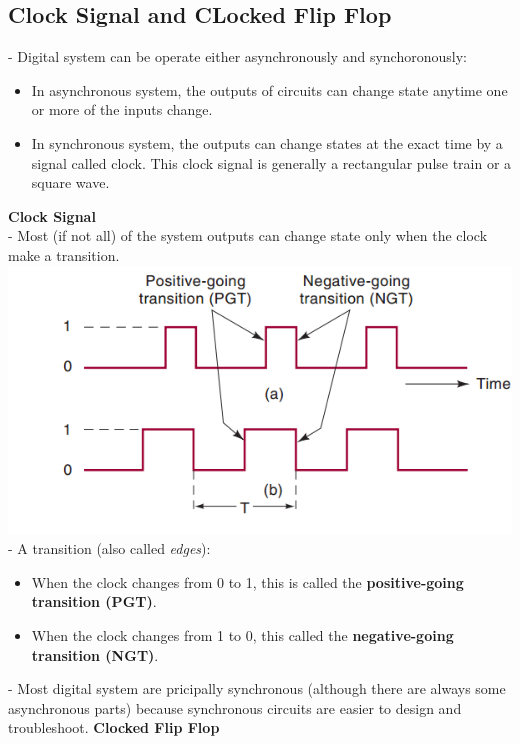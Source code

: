 \documentclass[12pt]{article}
\begin{document}
\subsection{Clock Signal and CLocked Flip Flop}
- Digital system can be operate either asynchronously and synchoronously:
\begin{itemize}
	\item In asynchronous system, the outputs of circuits can change state anytime one or more of the inputs change.
	\item In synchronous system, the outputs can change states at the exact time by a signal called clock. This clock signal is generally a rectangular pulse train or a square wave.
\end{itemize}
\textbf{Clock Signal}\\
- Most (if not all) of the system  outputs can change state only when the clock make a transition. \\
\includegraphics[scale = 0.7]{hinh8}
- A transition (also called \textit{edges}):
\begin{itemize}
	\item When the clock changes from 0 to 1, this is called the \textbf{positive-going transition (PGT)}.
	\item When the clock changes from 1 to 0, this called the \textbf{negative-going transition (NGT)}.
\end{itemize}
- Most digital system are pricipally synchronous (although there are always some asynchronous parts) because synchronous circuits are easier to design and troubleshoot.
\bigbreak
\textbf{Clocked Flip Flop} \\
\end{document}
